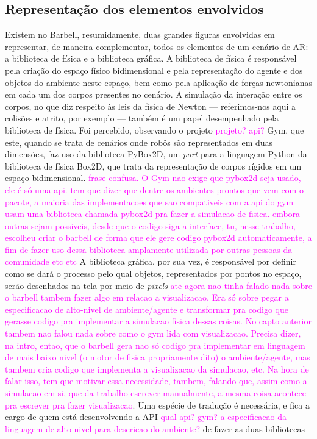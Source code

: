 \documentclass[cic,tc]{iiufrgs}
\newcommand\bruno[1]{\textcolor{magenta}{#1}}
\begin{document}
    \subsection{Representação dos elementos envolvidos}
    Existem no Barbell, resumidamente, duas grandes figuras envolvidas em representar, de maneira complementar, todos os elementos de um cenário de AR: a biblioteca
    de física e a biblioteca gráfica. A biblioteca de física é responsável pela criação do espaço físico bidimensional e pela representação do agente e dos objetos
    do ambiente neste espaço, bem como pela aplicação de forças newtonianas em cada um dos corpos presentes no cenário. A simulação da interação entre os corpos, no que diz
    respeito às leis da física de Newton --- referimos-nos aqui a colisões e atrito, por exemplo --- também é um papel desempenhado pela biblioteca de física.
    Foi percebido, observando o projeto \bruno{projeto? api?} Gym, que este, quando se trata de cenários onde robôs são representados em duas dimensões, faz uso da biblioteca PyBox2D,
    um \textit{port} para a linguagem Python da biblioteca de física Box2D, que trata da representação de corpos rígidos em um espaço bidimensional. \bruno{frase confusa. O Gym nao exige que pybox2d seja usado, ele é só uma api. tem que dizer que dentre os ambientes prontos que vem com o pacote, a maioria das implementacoes que sao compativeis com a api do gym usam uma biblioteca chamada pybox2d pra fazer a simulacao de fisica. embora outras sejam possiveis, desde que o codigo siga a interface, tu, nesse trabalho, escolheu criar o barbell de forma que ele gere codigo pybox2d automaticamente, a fim de fazer uso dessa biblioteca amplamente utilizada por outras pessoas da comunidade etc etc}
    A biblioteca gráfica, por sua vez, é responsável por definir como se dará o processo pelo qual objetos, representados por pontos no espaço, serão desenhados
    na tela por meio de \textit{pixels} \bruno{ate agora nao tinha falado nada sobre o barbell tambem fazer algo em relacao a visualizacao. Era só sobre pegar a especificacao de alto-nivel de ambiente/agente e transformar pra codigo que gerasse codigo pra implementar a simulacao fisica dessas coisas. No capto anterior tambem nao falou nada sobre como o gym lida com visualizacao. Precisa dizer, na intro, entao, que o barbell gera nao só codigo pra implementar em linguagem de mais baixo nivel (o motor de fisica propriamente dito) o ambiente/agente, mas tambem cria codigo que implementa a visualizacao da simulacao, etc. Na hora de falar isso, tem que motivar essa necessidade, tambem, falando que, assim como a simulacao em si, que da trabalho escrever manualmente, a mesma coisa acontece pra escrever pra fazer visualizacao}. Uma espécie de tradução é necessária, e fica a cargo de quem está desenvolvendo a API \bruno{qual api? gym? a especificacao da linguagem de alto-nivel para descricao do ambiente?} de fazer as duas bibliotecas
\end{document}
